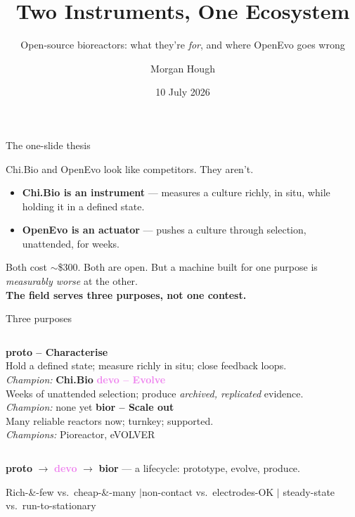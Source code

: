 \documentclass[aspectratio=169,11pt]{beamer}
\title{\textbf{Two Instruments, One Ecosystem}}
\subtitle{Open-source bioreactors: what they're \emph{for}, and where OpenEvo goes wrong}
\author{Morgan Hough}
\institute{\small Biopunk Wetware Meeting \quad\textbullet\quad \texttt{github.com/m9h/biopunk-bioreactor}}
\date{10 July 2026}
\newcommand{\bd}[1]{\textcolor{bad}{#1}}
\newcommand{\ac}[1]{\textcolor{accent}{\textbf{#1}}}
\begin{document}
{
\begin{frame}[plain]
  \titlepage
\end{frame}}

\begin{frame}{The one-slide thesis}
  \begin{block}{Chi.Bio and OpenEvo look like competitors. They aren't.}
  \begin{itemize}
    \item \ac{Chi.Bio is an instrument} --- measures a culture richly, in situ, while holding it in a defined state.
    \item \ac{OpenEvo is an actuator} --- pushes a culture through selection, unattended, for weeks.
  \end{itemize}
  \end{block}
  \vspace{0.5em}
  Both cost $\sim$\$300. Both are open. But a machine built for one purpose is
  \emph{measurably worse} at the other. \\[0.4em]
  \textbf{The field serves three purposes, not one contest.}
\end{frame}

\begin{frame}{Three purposes}
  \begin{columns}[T]
      \textbf{\textcolor{accent}{proto -- Characterise}}\\[0.3em]
      Hold a defined state; measure richly in situ; close feedback loops.\\[0.4em]
      \emph{Champion:} \ac{Chi.Bio}
      \textbf{\textcolor{violet}{devo -- Evolve}}\\[0.3em]
      Weeks of unattended selection; produce \emph{archived, replicated} evidence.\\[0.4em]
      \emph{Champion:} \bd{none yet}
      \textbf{\textcolor{warn}{bior -- Scale out}}\\[0.3em]
      Many reliable reactors now; turnkey; supported.\\[0.4em]
      \emph{Champions:} Pioreactor, eVOLVER
  \end{columns}
  \vspace{0.6em}
  \begin{center}
  \textcolor{accent}{\textbf{proto}} $\rightarrow$ \textcolor{violet}{\textbf{devo}}
  $\rightarrow$ \textcolor{warn}{\textbf{bior}} \quad --- a lifecycle: prototype, evolve, produce.
  \end{center}
  \vspace{0.3em}
  \begin{center}\small
  Rich-\&-few vs.\ cheap-\&-many \quad$|$\quad non-contact vs.\ electrodes-OK \quad$|$\quad
  steady-state vs.\ run-to-stationary
  \end{center}
\end{frame}
\end{document}

